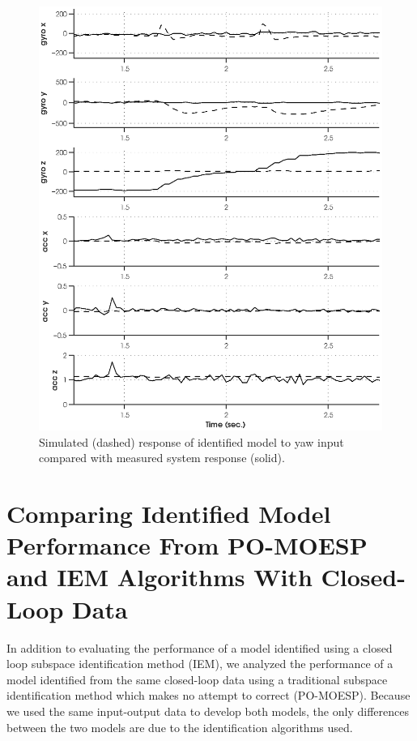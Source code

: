 \newpage
\begin{figure}[htb!]
	\centering
	\includegraphics{../fig/sim_1760_yaw.eps}
	\caption{Simulated (dashed) response of identified model to yaw input compared with measured system response (solid).}
	\label{sim_1760_yaw}
\end{figure}\clearpage


\newpage
\section{Comparing Identified Model Performance From PO-MOESP and IEM Algorithms With Closed-Loop Data}
In addition to evaluating the performance of a model identified using a closed loop subspace identification method (IEM), we analyzed the performance of a model identified from the same closed-loop data using a traditional subspace identification method which makes no attempt to correct  (PO-MOESP). Because we used the same input-output data to develop both models, the only differences between the two models are due to the identification algorithms used. 

